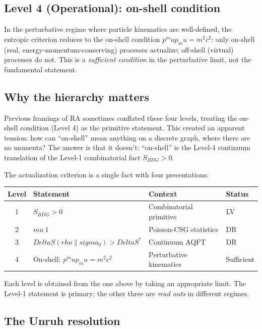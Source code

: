 \documentclass[11pt]{article}
\def\Delta{Delta}%
\def\rho{rho}%
\def\sigma{sigma}%
\def\mu{mu}%
\def\mathrm#1{#1}%
\def\approx{~}%
\begin{document}
\subsection{Level 4 (Operational): on-shell condition}

In the perturbative regime where particle kinematics are well-defined, the entropic criterion reduces to the on-shell condition $p^\mu p_\mu = m^2 c^2$: only on-shell (real, energy-momentum-conserving) processes actualize; off-shell (virtual) processes do not. This is a \emph{sufficient condition} in the perturbative limit, not the fundamental statement.

\subsection{Why the hierarchy matters}

Previous framings of RA sometimes conflated these four levels, treating the on-shell condition (Level 4) as the primitive statement. This created an apparent tension: how can ``on-shell'' mean anything on a discrete graph, where there are no momenta? The answer is that it doesn't: ``on-shell'' is the Level-4 continuum translation of the Level-1 combinatorial fact $S_{\mathrm{BDG}} > 0$.

The actualization criterion is a single fact with four presentations:
\begin{center}
\begin{tabular}{clll}
\toprule
Level & Statement & Context & Status \\
\midrule
1 & $S_{\mathrm{BDG}} > 0$ & Combinatorial primitive & LV \\
2 & $\mu \approx 1$ & Poisson-CSG statistics & DR \\
3 & $\Delta S(\rho\|\sigma_0) > \Delta S^*$ & Continuum AQFT & DR \\
4 & On-shell: $p^\mu p_\mu = m^2 c^2$ & Perturbative kinematics & Sufficient \\
\bottomrule
\end{tabular}
\end{center}
Each level is obtained from the one above by taking an appropriate limit. The Level-1 statement is primary; the other three are \emph{read outs} in different regimes.

\subsection{The Unruh resolution}
\label{sec:unruh}
\end{document}
